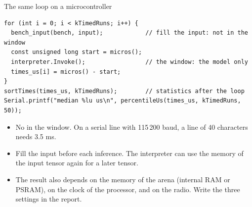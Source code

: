 \begin{frame}[fragile]{The same loop on a microcontroller}
\begin{lstlisting}[style=cpp]
for (int i = 0; i < kTimedRuns; i++) {
  bench_input(bench, input);            // fill the input: not in the window
  const unsigned long start = micros();
  interpreter.Invoke();                 // the window: the model only
  times_us[i] = micros() - start;
}
sortTimes(times_us, kTimedRuns);        // statistics after the loop
Serial.printf("median %lu us\n", percentileUs(times_us, kTimedRuns, 50));
\end{lstlisting}
  \small
  \begin{itemize}
    \item No  in the window. On a serial line with
          115\,200 baud, a line of 40 characters needs 3.5 ms.
    \item Fill the input before each inference. The interpreter can use the
          memory of the input tensor again for a later tensor.
    \item The result also depends on the memory of the arena (internal RAM
          or PSRAM), on the clock of the processor, and on the radio. Write
          the three settings in the report.
  \end{itemize}
\end{frame}

